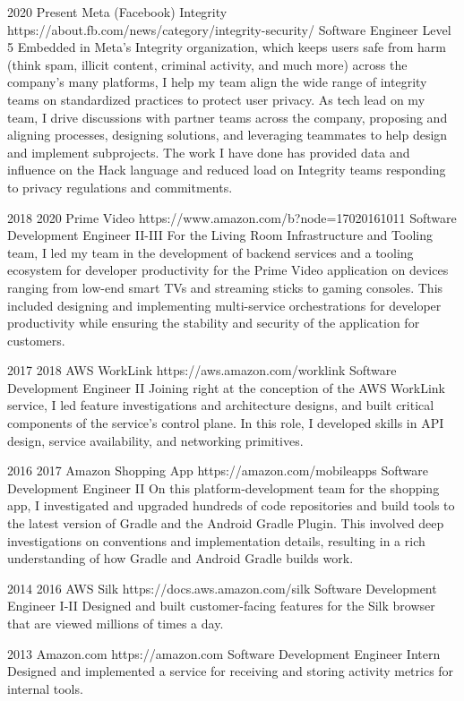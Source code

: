 \job
{2020} {Present}
{Meta (Facebook) Integrity} {https://about.fb.com/news/category/integrity-security/}
{Software Engineer Level 5}
{
    Embedded in Meta's Integrity organization, which keeps users safe from harm (think spam, illicit content, criminal activity, and much more) across the company's many platforms, I help my team align the wide range of integrity teams on standardized practices to protect user privacy. As tech lead on my team, I drive discussions with partner teams across the company, proposing and aligning processes, designing solutions, and leveraging teammates to help design and implement subprojects. The work I have done has provided data and influence on the  {Hack language} and reduced load on Integrity teams responding to  {privacy regulations and commitments}.
}

\job
{2018} {2020}
{Prime Video} {https://www.amazon.com/b?node=17020161011}
{Software Development Engineer II-III}
{
    For the Living Room Infrastructure and Tooling team, I led my team in the development of backend services and a tooling ecosystem for developer productivity for the Prime Video application on devices ranging from low-end smart TVs and streaming sticks to gaming consoles. This included designing and implementing multi-service orchestrations for developer productivity while ensuring the stability and security of the application for customers.
}

\job
{2017} {2018}
{AWS WorkLink} {https://aws.amazon.com/worklink}
{Software Development Engineer II}
{
    Joining right at the conception of the AWS WorkLink service, I led feature investigations and architecture designs, and built critical components of the service's control plane. In this role, I developed skills in API design, service availability, and networking primitives.
}

\job
{2016} {2017}
{Amazon Shopping App} {https://amazon.com/mobileapps}
{Software Development Engineer II}
{
    On this platform-development team for the shopping app, I investigated and upgraded hundreds of code repositories and build tools to the latest version of  {Gradle} and the  {Android Gradle Plugin}. This involved deep investigations on conventions and implementation details, resulting in a rich understanding of how Gradle and Android Gradle builds work.
}

\job
{2014} {2016}
{AWS Silk} {https://docs.aws.amazon.com/silk}
{Software Development Engineer I-II}
{
    Designed and built customer-facing features for the Silk browser that are viewed millions of times a day.
}

\job
{2013} {}
{Amazon.com} {https://amazon.com}
{Software Development Engineer Intern}
{
    Designed and implemented a service for receiving and storing activity metrics for internal tools.
}
